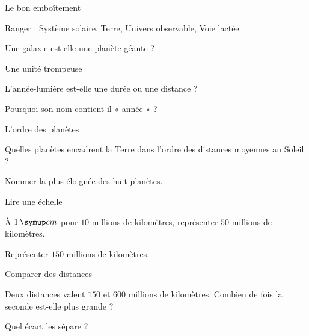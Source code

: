 \par\noindent\begin{minipage}{\linewidth}
\begin{exercice}[1]{Le bon emboîtement}
\begin{questions}
\item Ranger : Système solaire, Terre, Univers observable, Voie lactée.
\item Une galaxie est-elle une planète géante ?
\end{questions}
\end{exercice}
\end{minipage}
\par\noindent\begin{minipage}{\linewidth}
\begin{exercice}[1]{Une unité trompeuse}
\begin{questions}
\item L’année-lumière est-elle une durée ou une distance ?
\item Pourquoi son nom contient-il « année » ?
\end{questions}
\end{exercice}
\end{minipage}
\par\noindent\begin{minipage}{\linewidth}
\begin{exercice}[1]{L’ordre des planètes}
\begin{questions}
\item Quelles planètes encadrent la Terre dans l’ordre des distances moyennes au Soleil ?
\item Nommer la plus éloignée des huit planètes.
\end{questions}
\end{exercice}
\end{minipage}
\par\noindent\begin{minipage}{\linewidth}
\begin{exercice}[1]{Lire une échelle}
\begin{questions}
\item À $1\unite{cm}$ pour $10$ millions de kilomètres, représenter $50$ millions de kilomètres.
\item Représenter $150$ millions de kilomètres.
\end{questions}
\end{exercice}
\end{minipage}
\clearpage{}
\par\noindent\begin{minipage}{\linewidth}
\begin{exercice}[2]{Comparer des distances}
\begin{questions}
\item Deux distances valent $150$ et $600$ millions de kilomètres. Combien de fois la seconde est-elle plus grande ?
\item Quel écart les sépare ?
\end{questions}
\end{exercice}
\end{minipage}
